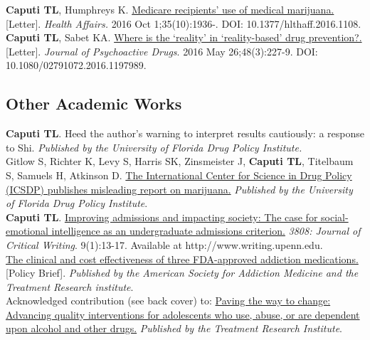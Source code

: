 \documentclass[10pt, letterpaper]{article}
\newcommand{\years}[1]{\marginnote{\normalsize #1}}
\begin{document}
\years{2016}\textbf{Caputi TL}, Humphreys K. \href{http://dx.doi.org/10.1377/hlthaff.2016.1108}{Medicare recipients’ use of medical marijuana.} [Letter]. \textit{Health Affairs.} 2016 Oct 1;35(10):1936-. DOI: 10.1377/hlthaff.2016.1108.\\[.2cm]
\years{2016}\textbf{Caputi TL}, Sabet KA. \href{http://dx.doi.org/10.1080/02791072.2016.1197989}{Where is the ‘reality’ in ‘reality-based’ drug prevention?.} [Letter]. \textit{Journal of Psychoactive Drugs}. 2016 May 26;48(3):227-9. DOI: 10.1080/02791072.2016.1197989.\\[.2cm]


\subsection*{Other Academic Works}
\noindent
\years{2017}\textbf{Caputi TL}. Heed the author’s warning to interpret results cautiously: a response to Shi. \emph{Published by the University of Florida Drug Policy Institute.}\\[.2cm]
\years{2015}Gitlow S, Richter K, Levy S, Harris SK, Zinsmeister J, \textbf{Caputi TL}, Titelbaum S, Samuels H, Atkinson D.  \href{https://www.academia.edu/16576576/The_International_Centre_for_Science_in_Drug_Policy_ICSDP_Publishes_Misleading_Report_on_Marijuana}{The International Center for Science in Drug Policy (ICSDP) publishes misleading report on marijuana.} \textit{Published by the University of Florida Drug Policy Institute}.\\ [.2cm]
\years{2015}\textbf{Caputi TL}. \href{http://www.writing.upenn.edu/critical/opportunities/3808/pdf/3808_fall_2015.pdf#page=13}{Improving admissions and impacting society: The case for social-emotional intelligence as an undergraduate admissions criterion.} \textit{3808: Journal of Critical Writing}. 9(1):13-17. Available at
http://www.writing.upenn.edu.\\[.2cm]
\years{2014}\href{https://web.archive.org/web/20170622171723/https://www.asam.org/docs/default-source/2015-conference-epk/asam-impact_cce-4-02-14.pdf?sfvrsn=4}{The clinical and cost effectiveness of three FDA-approved addiction medications.} [Policy Brief]. \textit{Published by the American Society for Addiction Medicine and the Treatment Research institute}. \\[.2cm]
\years{2014}Acknowledged contribution (see back cover) to: \href{https://issuu.com/tri_solutions/docs/tri_report_singlepages_highres}{Paving the way to change: Advancing quality interventions for adolescents who use, abuse, or are dependent upon alcohol and other drugs.} \textit{Published by the Treatment Research Institute}. \\[.2cm]
\end{document}
